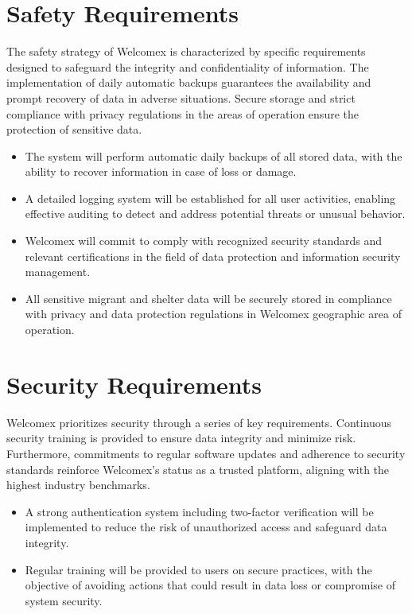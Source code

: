 \documentclass{scrreprt}
\begin{document}
\section{Safety Requirements}
The safety strategy of Welcomex is characterized by specific requirements designed to safeguard the integrity and confidentiality of information. The implementation of daily automatic backups guarantees the availability and prompt recovery of data in adverse situations. Secure storage and strict compliance with privacy regulations in the areas of operation ensure the protection of sensitive data.
\begin{itemize}
    \item The system will perform automatic daily backups of all stored data, with the ability to recover information in case of loss or damage.
    \item A detailed logging system will be established for all user activities, enabling effective auditing to detect and address potential threats or unusual behavior.
    \item Welcomex will commit to comply with recognized security standards and relevant certifications in the field of data protection and information security management.
    \item All sensitive migrant and shelter data will be securely stored in compliance with privacy and data protection regulations in Welcomex geographic area of operation.
\end{itemize}

\section{Security Requirements}
Welcomex prioritizes security through a series of key requirements. Continuous security training is provided to ensure data integrity and minimize risk. Furthermore, commitments to regular software updates and adherence to security standards reinforce Welcomex's status as a trusted platform, aligning with the highest industry benchmarks.

\begin{itemize}
    \item A strong authentication system including two-factor verification will be implemented to reduce the risk of unauthorized access and safeguard data integrity.
    \item Regular training will be provided to users on secure practices, with the objective of avoiding actions that could result in data loss or compromise of system security.
\end{itemize}
\end{document}
